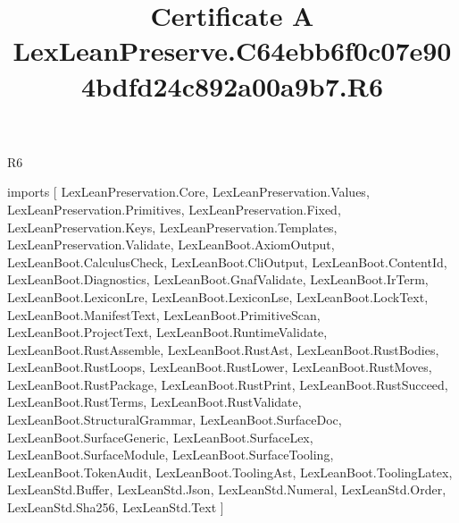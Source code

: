 \begin{lexlean}{R6}
\title{Certificate A LexLeanPreserve.C64ebb6f0c07e904bdfd24c892a00a9b7.R6}
\begin{coremodule}
imports [
  LexLeanPreservation.Core,
  LexLeanPreservation.Values,
  LexLeanPreservation.Primitives,
  LexLeanPreservation.Fixed,
  LexLeanPreservation.Keys,
  LexLeanPreservation.Templates,
  LexLeanPreservation.Validate,
  LexLeanBoot.AxiomOutput,
  LexLeanBoot.CalculusCheck,
  LexLeanBoot.CliOutput,
  LexLeanBoot.ContentId,
  LexLeanBoot.Diagnostics,
  LexLeanBoot.GnafValidate,
  LexLeanBoot.IrTerm,
  LexLeanBoot.LexiconLre,
  LexLeanBoot.LexiconLse,
  LexLeanBoot.LockText,
  LexLeanBoot.ManifestText,
  LexLeanBoot.PrimitiveScan,
  LexLeanBoot.ProjectText,
  LexLeanBoot.RuntimeValidate,
  LexLeanBoot.RustAssemble,
  LexLeanBoot.RustAst,
  LexLeanBoot.RustBodies,
  LexLeanBoot.RustLoops,
  LexLeanBoot.RustLower,
  LexLeanBoot.RustMoves,
  LexLeanBoot.RustPackage,
  LexLeanBoot.RustPrint,
  LexLeanBoot.RustSucceed,
  LexLeanBoot.RustTerms,
  LexLeanBoot.RustValidate,
  LexLeanBoot.StructuralGrammar,
  LexLeanBoot.SurfaceDoc,
  LexLeanBoot.SurfaceGeneric,
  LexLeanBoot.SurfaceLex,
  LexLeanBoot.SurfaceModule,
  LexLeanBoot.SurfaceTooling,
  LexLeanBoot.TokenAudit,
  LexLeanBoot.ToolingAst,
  LexLeanBoot.ToolingLatex,
  LexLeanStd.Buffer,
  LexLeanStd.Json,
  LexLeanStd.Numeral,
  LexLeanStd.Order,
  LexLeanStd.Sha256,
  LexLeanStd.Text
]


\end{coremodule}
\end{lexlean}
